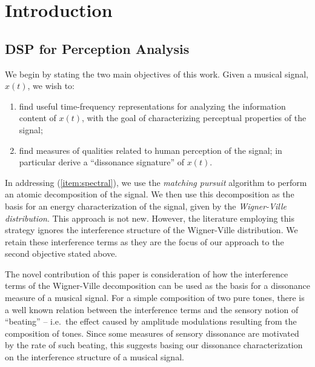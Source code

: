 %
\section{Introduction}
\subsection{DSP for Perception Analysis}
We begin by stating the two main objectives of this work.  Given a musical
signal, $x(t)$, we wish to:
\begin{enumerate}
\item \label{item:spectral} find useful time-frequency representations for
  analyzing the information content of $x(t)$, with the goal of characterizing
  perceptual properties of the signal;
\item \label{item:dissonance} %
  find measures of qualities related to human perception of the signal;
  in particular derive a ``dissonance signature'' of $x(t)$. 
\end{enumerate}

In addressing (\ref{item:spectral}), we use the \emph{matching pursuit}
algorithm \cite{Mallat:1993}
to perform an atomic decomposition of the signal.  We then use this
decomposition as the basis for an energy characterization of the signal, given
by the \emph{Wigner-Ville distribution}.  This approach is not new.  However,
the literature employing this strategy ignores the interference structure of
the Wigner-Ville distribution.  We retain these interference terms as they are
the focus of our approach to the second objective stated above.

The novel contribution of this paper is consideration of how the interference
terms of the Wigner-Ville decomposition can be used as the basis for a
dissonance measure of a musical signal.  For a simple composition of two pure
tones, there is a well known relation between the interference terms and
the sensory notion of ``beating'' -- i.e.~the effect caused by amplitude
modulations resulting from the composition of tones.  Since some measures of
sensory dissonance are motivated by the rate of such beating, this
suggests basing our dissonance characterization on the interference structure
of a musical signal.

